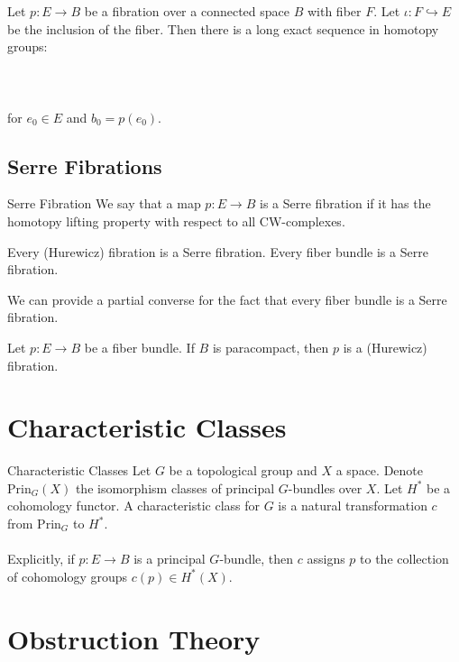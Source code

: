 \documentclass[a4paper]{article}
\begin{document}
\begin{thm}{}{} Let $p:E\to B$ be a fibration over a connected space $B$ with fiber $F$. Let $\iota:F\hookrightarrow E$ be the inclusion of the fiber. Then there is a long exact sequence in homotopy groups: \\~\\
\\~\\
for $e_0\in E$ and $b_0=p(e_0)$. 
\end{thm}

\subsection{Serre Fibrations}
\begin{defn}{Serre Fibration}{} We say that a map $p:E\to B$ is a Serre fibration if it has the homotopy lifting property with respect to all CW-complexes. 
\end{defn}

\begin{prp}{}{} Every (Hurewicz) fibration is a Serre fibration. Every fiber bundle is a Serre fibration. 
\end{prp}

We can provide a partial converse for the fact that every fiber bundle is a Serre fibration. 

\begin{prp}{}{} Let $p:E\to B$ be a fiber bundle. If $B$ is paracompact, then $p$ is a (Hurewicz) fibration. 
\end{prp}

\pagebreak
\section{Characteristic Classes}
\begin{defn}{Characteristic Classes}{} Let $G$ be a topological group and $X$ a space. Denote $\text{Prin}_G(X)$ the isomorphism classes of principal $G$-bundles over $X$. Let $H^\ast$ be a cohomology functor. A characteristic class for $G$ is a natural transformation $c$ from $\text{Prin}_G$ to $H^\ast$. \\~\\

Explicitly, if $p:E\to B$ is a principal $G$-bundle, then $c$ assigns $p$ to the collection of cohomology groups $c(p)\in H^\ast(X)$. 
\end{defn}

\pagebreak
\section{Obstruction Theory}
\end{document}
